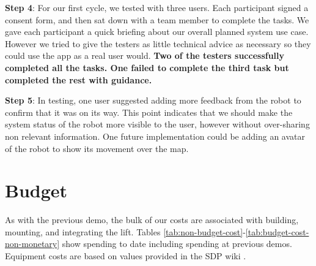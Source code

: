 \documentclass{article}
\begin{document}
{\bf Step 4}: For our first cycle, we tested with three users. Each participant signed a consent form, and then sat down with a team member to complete the tasks. We gave each participant a quick briefing about our overall planned system use case. However we tried to give the testers as little technical advice as necessary so they could use the app as a real user would. {\bf Two of the testers successfully completed all the tasks. One failed to complete the third task but completed the rest with guidance.}

{\bf Step 5}: In testing, one user suggested adding more feedback from the robot to confirm that it was on its way. This point indicates that we should make the system status of the robot more visible to the user, however without over-sharing non relevant information. One future implementation could be adding an avatar of the robot to show its movement over the map.

\section{Budget}
As with the previous demo, the bulk of our costs are associated with building, mounting, and integrating the lift. Tables \ref{tab:non-budget-cost}-\ref{tab:budget-cost-non-monetary} show spending to date including spending at previous demos. Equipment costs are based on values provided in the SDP wiki \cite{sdpcosts}.

\begin{table}[h]
\begin{center}
\caption{Non-budgeted monetary costs at demo \demoNumber. Note that we have chosen to stop using the EV3 and instead use the Arduino kit.}
\label{tab:non-budget-cost}
\end{center}
\end{table}
\end{document}
